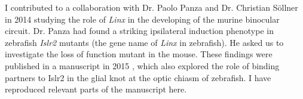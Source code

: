 I contributed to a collaboration with Dr. Paolo Panza and Dr. Christian S\"ollner in 2014 studying the role of \emph{Linx} in the developing of the murine binocular circuit.
Dr. Panza had found a striking ipsilateral induction phenotype in zebrafish \emph{Islr2} mutants (the gene name of \emph{Linx} in zebrafish).
He asked us to investigate the loss of function mutant in the mouse.
These findings were published in a manuscript in 2015 \cite{panza2015lrr}, which also explored the role of binding partners to Islr2 in the glial knot at the optic chiasm of zebrafish.
I have reproduced relevant parts of the manuscript here.